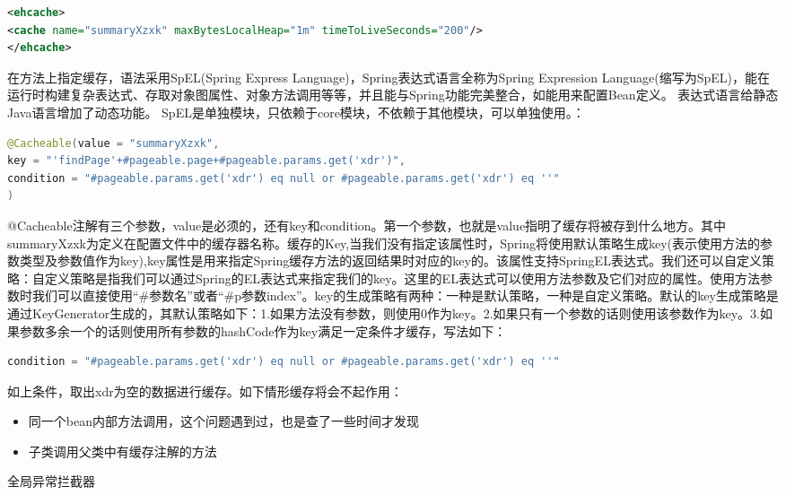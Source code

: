 \documentclass[11pt,fleqn]{book}
\makeatletter
\numberwithin{dummy}{section}
\theoremstyle{ocrenumbox}
\theoremstyle{blacknumex}
\theoremstyle{blacknumbox}
\theoremstyle{ocrenum}
\renewcommand{\subsection}{\@startsection {subsection}{2}{\z@}
	{-3ex \@plus -0.1ex \@minus -.4ex}
	{0.5ex \@plus.2ex }
	{\normalfont\sffamily\bfseries}}
\makeatother
\begin{document}
\begin{lstlisting}[language=XML]
<ehcache>
<cache name="summaryXzxk" maxBytesLocalHeap="1m" timeToLiveSeconds="200"/>
</ehcache>
\end{lstlisting}

在方法上指定缓存，语法采用SpEL(Spring Express Language)，Spring表达式语言全称为Spring Expression Language(缩写为SpEL)，能在运行时构建复杂表达式、存取对象图属性、对象方法调用等等，并且能与Spring功能完美整合，如能用来配置Bean定义。 表达式语言给静态Java语言增加了动态功能。
SpEL是单独模块，只依赖于core模块，不依赖于其他模块，可以单独使用。：

\begin{lstlisting}[language=Java]
@Cacheable(value = "summaryXzxk",
key = "'findPage'+#pageable.page+#pageable.params.get('xdr')",
condition = "#pageable.params.get('xdr') eq null or #pageable.params.get('xdr') eq ''"
)
\end{lstlisting}

@Cacheable注解有三个参数，value是必须的，还有key和condition。第一个参数，也就是value指明了缓存将被存到什么地方。其中summaryXzxk为定义在配置文件中的缓存器名称。缓存的Key,当我们没有指定该属性时，Spring将使用默认策略生成key(表示使用方法的参数类型及参数值作为key),key属性是用来指定Spring缓存方法的返回结果时对应的key的。该属性支持SpringEL表达式。我们还可以自定义策略：自定义策略是指我们可以通过Spring的EL表达式来指定我们的key。这里的EL表达式可以使用方法参数及它们对应的属性。使用方法参数时我们可以直接使用“\#参数名”或者“\#p参数index”。key的生成策略有两种：一种是默认策略，一种是自定义策略。默认的key生成策略是通过KeyGenerator生成的，其默认策略如下：1.如果方法没有参数，则使用0作为key。2.如果只有一个参数的话则使用该参数作为key。3.如果参数多余一个的话则使用所有参数的hashCode作为key满足一定条件才缓存，写法如下：

\begin{lstlisting}[language=Java]
condition = "#pageable.params.get('xdr') eq null or #pageable.params.get('xdr') eq ''"
\end{lstlisting}

如上条件，取出xdr为空的数据进行缓存。如下情形缓存将会不起作用：

\begin{itemize}
	\item{同一个bean内部方法调用，这个问题遇到过，也是查了一些时间才发现}
	\item{子类调用父类中有缓存注解的方法}
\end{itemize}

\subsection{全局异常拦截器}
\end{document}
